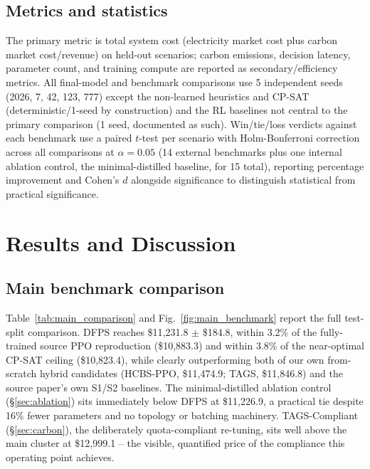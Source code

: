 \documentclass[journal]{IEEEtran}
\begin{document}
\subsection{Metrics and statistics}
The primary metric is total system cost (electricity market cost plus carbon market cost/revenue) on held-out scenarios; carbon emissions, decision latency, parameter count, and training compute are reported as secondary/efficiency metrics. All final-model and benchmark comparisons use 5 independent seeds (2026, 7, 42, 123, 777) except the non-learned heuristics and CP-SAT (deterministic/1-seed by construction) and the RL baselines not central to the primary comparison (1 seed, documented as such). Win/tie/loss verdicts against each benchmark use a paired $t$-test per scenario with Holm-Bonferroni correction across all comparisons at $\alpha=0.05$ (14 external benchmarks plus one internal ablation control, the minimal-distilled baseline, for 15 total), reporting percentage improvement and Cohen's $d$ alongside significance to distinguish statistical from practical significance.

\section{Results and Discussion}

\subsection{Main benchmark comparison}
Table~\ref{tab:main_comparison} and Fig.~\ref{fig:main_benchmark} report the full test-split comparison. DFPS reaches \$11{,}231.8 $\pm$ \$184.8, within 3.2\% of the fully-trained source PPO reproduction (\$10{,}883.3) and within 3.8\% of the near-optimal CP-SAT ceiling (\$10{,}823.4), while clearly outperforming both of our own from-scratch hybrid candidates (HCBS-PPO, \$11{,}474.9; TAGS, \$11{,}846.8) and the source paper's own S1/S2 baselines. The minimal-distilled ablation control (\S\ref{sec:ablation}) sits immediately below DFPS at \$11{,}226.9, a practical tie despite 16\% fewer parameters and no topology or batching machinery. TAGS-Compliant (\S\ref{sec:carbon}), the deliberately quota-compliant re-tuning, sits well above the main cluster at \$12{,}999.1 -- the visible, quantified price of the compliance this operating point achieves.
\end{document}
